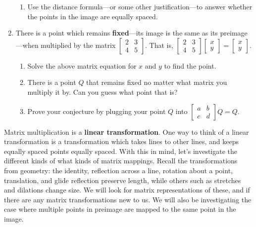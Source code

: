 \documentclass[../gatm.tex]{subfiles}
\begin{document}
\begin{enumerate}
\begin{enumerate}
\item Use the distance formula---or some other justification---to answer whether the points in the image are equally spaced.
\end{enumerate}
\item There is a point which remains \textbf{fixed}---its image is the same as its preimage---when multiplied by the matrix $\left[\begin{array}{cc}2 & 3 \\ 4 & 5 \end{array}\right]$. That is, $\left[\begin{array}{cc}2 & 3 \\ 4 & 5 \end{array}\right]\left[\begin{array}{c} x \\ y \end{array}\right]=\left[\begin{array}{c} x \\ y \end{array}\right]$.
\begin{enumerate}
\item Solve the above matrix equation for $x$ and $y$ to find the point.
\item There is a point $Q$ that remains fixed no matter what matrix you multiply it by. Can you guess what point that is?
\item Prove your conjecture by plugging your point $Q$ into $\left[\begin{array}{cc}a & b \\ c & d\end{array}\right]Q=Q$.
\end{enumerate}
\setcounter{mp_problem_i}{\value{enumi}}
\end{enumerate}

Matrix multiplication is a \textbf{linear transformation}. One way to think of a linear transformation is a transformation which takes lines to other lines, and keeps equally spaced points equally spaced. With this in mind, let's investigate the different kinds of what kinds of matrix mappings. Recall the transformations from geometry: the identity, reflection across a line, rotation about a point, translation, and glide reflection preserve length, while others such as stretches and dilations change size. We will look for matrix representations of these, and if there are any matrix transformations new to us. We will also be investigating the case where multiple points in preimage are mapped to the same point in the image.
\end{document}
